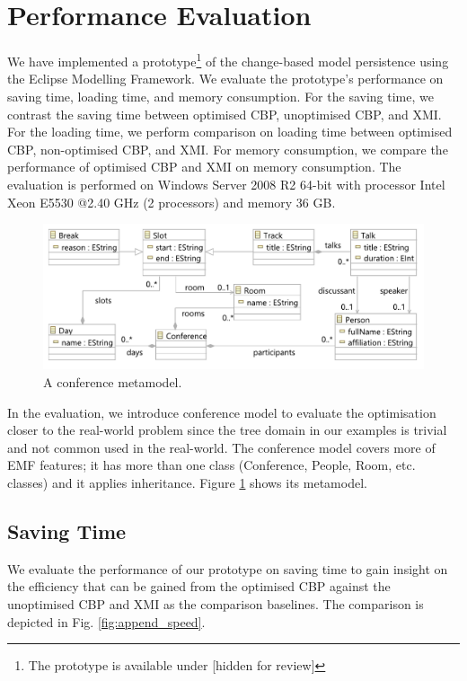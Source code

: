 \documentclass{llncs}
\begin{document}
\section{Performance Evaluation}
\label{sec:performance_evaluation}
We have implemented a prototype\footnote{The prototype is available under [hidden for review] %
} of the change-based model persistence using the Eclipse Modelling Framework. We evaluate the prototype's performance on saving time, loading time, and memory consumption. For the saving time, we contrast the saving time between optimised CBP, unoptimised CBP, and XMI. For the loading time, we perform comparison on loading time between optimised CBP, non-optimised CBP, and XMI. For memory consumption, we compare the performance of optimised CBP and XMI on memory consumption. The evaluation is performed on Windows Server 2008 R2 64-bit with processor Intel Xeon E5530 @2.40 GHz (2 processors) and memory 36 GB.

\begin{figure}[htbp]
    \centering
    \includegraphics[width=0.9\linewidth]{conference_metamodel}
    \caption{A conference metamodel.}   
    \label{fig:node_metamodel}
\end{figure}

In the evaluation, we introduce conference model to evaluate the optimisation closer to the real-world problem since the tree domain in our examples is trivial and not common used in the real-world. The conference model covers more of EMF features; it has more than one class (Conference, People, Room, etc. classes) and it applies inheritance. Figure \ref{fig:node_metamodel} shows its metamodel. 

\subsection{Saving Time}
\label{subsec:saving_time_test}
We evaluate the performance of our prototype on saving time to gain insight on the efficiency that can be gained from the optimised CBP against the unoptimised CBP and XMI as the comparison baselines. The comparison is depicted in Fig. \ref{fig:append_speed}.
\end{document}
